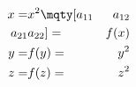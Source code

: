\begin{equation}
	\begin{aligned}
		x = & x^2 \mqty[a_{11} & a_{12} \\ a_{21} & a_{22}] =& f(x) \\
		y = & f(y) =           & y^2    \\
		z = & f(z) =           & z^2
	\end{aligned}
\end{equation}

